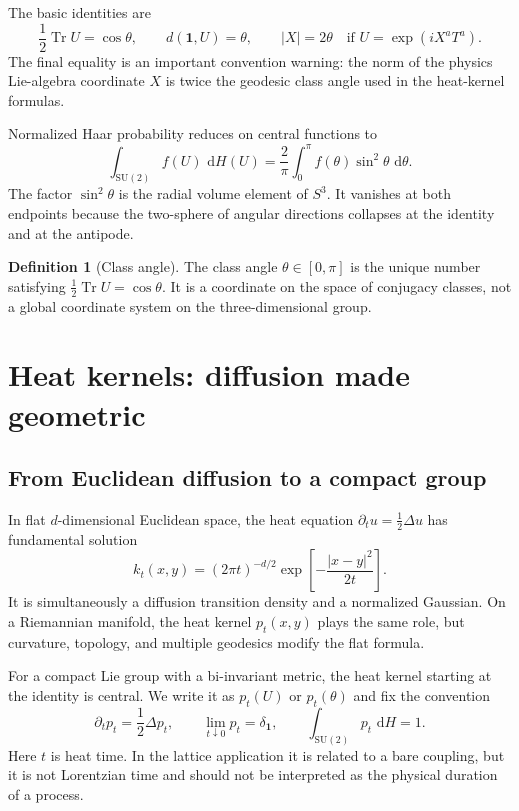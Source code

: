 \documentclass[11pt]{article}
\theoremstyle{definition}
\newtheorem{definition}[principle]{Definition}
\newcommand{\SU}{\mathrm{SU}(2)}
\newcommand{\dd}{\,\mathrm{d}}
\newcommand{\abs}[1]{\left|#1\right|}
\newcommand{\Tr}{\operatorname{Tr}}
\begin{document}
The basic identities are
\begin{equation}\label{expl:eq:trace-angle}
 \frac12\Tr U=\cos\theta,
 \qquad d(\mathbf 1,U)=\theta,
 \qquad \abs{X}=2\theta
 \quad\text{if }U=\exp(iX^aT^a).
\end{equation}
The final equality is an important convention warning: the norm of the
physics Lie-algebra coordinate $X$ is twice the geodesic class angle used in
the heat-kernel formulas.

Normalized Haar probability reduces on central functions to
\begin{equation}\label{expl:eq:haar}
 \int_{\SU}f(U)\,\dd H(U)
 =\frac{2}{\pi}\int_0^\pi f(\theta)\sin^2\theta\,\dd\theta.
\end{equation}
The factor $\sin^2\theta$ is the radial volume element of $S^3$.  It vanishes
at both endpoints because the two-sphere of angular directions collapses at
the identity and at the antipode.

\begin{definition}[Class angle]
The class angle $\theta\in[0,\pi]$ is the unique number satisfying
$\tfrac12\Tr U=\cos\theta$.  It is a coordinate on the space of conjugacy
classes, not a global coordinate system on the three-dimensional group.
\end{definition}

\section{Heat kernels: diffusion made geometric}

\subsection{From Euclidean diffusion to a compact group}

In flat $d$-dimensional Euclidean space, the heat equation
$\partial_tu=\tfrac12\Delta u$ has fundamental solution
\begin{equation}\label{expl:eq:euclidean-heat}
 k_t(x,y)=(2\pi t)^{-d/2}
 \exp\left[-\frac{|x-y|^2}{2t}\right].
\end{equation}
It is simultaneously a diffusion transition density and a normalized
Gaussian.  On a Riemannian manifold, the heat kernel $p_t(x,y)$ plays the
same role, but curvature, topology, and multiple geodesics modify the flat
formula.

For a compact Lie group with a bi-invariant metric, the heat kernel starting
at the identity is central.  We write it as $p_t(U)$ or $p_t(\theta)$ and fix
the convention
\begin{equation}\label{expl:eq:heat-equation}
 \partial_t p_t=\frac12\Delta p_t,
 \qquad \lim_{t\downarrow0}p_t=\delta_{\mathbf 1},
 \qquad \int_{\SU}p_t\,\dd H=1.
\end{equation}
Here $t$ is heat time.  In the lattice application it is related to a bare
coupling, but it is not Lorentzian time and should not be interpreted as the
physical duration of a process.
\end{document}
